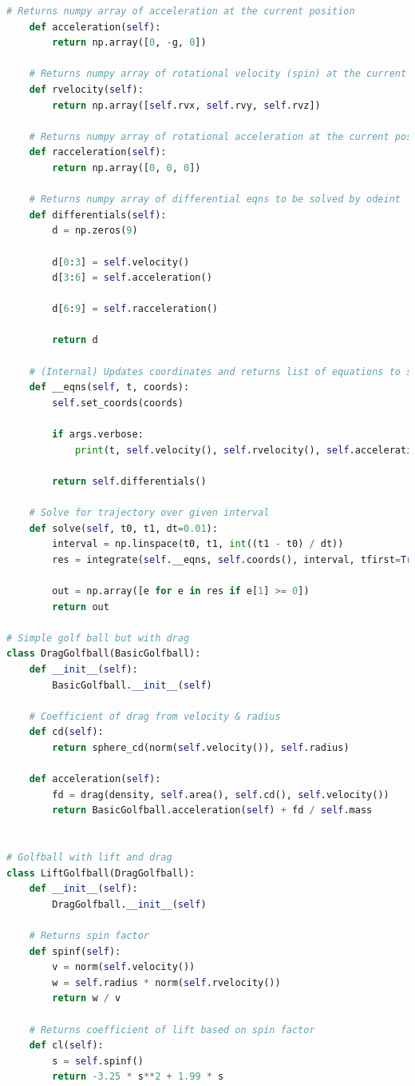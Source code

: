 \documentclass[12pt]{article}
\begin{document}
\begin{lstlisting}[language=Python, caption=Python model, style=PythonStyle, basicstyle=\tiny]
	# Returns numpy array of acceleration at the current position
	def acceleration(self):
		return np.array([0, -g, 0])

	# Returns numpy array of rotational velocity (spin) at the current position
	def rvelocity(self):
		return np.array([self.rvx, self.rvy, self.rvz])

	# Returns numpy array of rotational acceleration at the current position
	def racceleration(self):
		return np.array([0, 0, 0])

	# Returns numpy array of differential eqns to be solved by odeint
	def differentials(self):
		d = np.zeros(9)

		d[0:3] = self.velocity()
		d[3:6] = self.acceleration()

		d[6:9] = self.racceleration()

		return d

	# (Internal) Updates coordinates and returns list of equations to solve (for odeint)
	def __eqns(self, t, coords):
		self.set_coords(coords)

		if args.verbose:
			print(t, self.velocity(), self.rvelocity(), self.acceleration(), self.racceleration())

		return self.differentials()

	# Solve for trajectory over given interval
	def solve(self, t0, t1, dt=0.01):
		interval = np.linspace(t0, t1, int((t1 - t0) / dt))
		res = integrate(self.__eqns, self.coords(), interval, tfirst=True)[:, :3]

		out = np.array([e for e in res if e[1] >= 0])
		return out

# Simple golf ball but with drag
class DragGolfball(BasicGolfball):
	def __init__(self):
		BasicGolfball.__init__(self)

	# Coefficient of drag from velocity & radius
	def cd(self):
		return sphere_cd(norm(self.velocity()), self.radius)

	def acceleration(self):
		fd = drag(density, self.area(), self.cd(), self.velocity())
		return BasicGolfball.acceleration(self) + fd / self.mass


# Golfball with lift and drag
class LiftGolfball(DragGolfball):
	def __init__(self):
		DragGolfball.__init__(self)

	# Returns spin factor
	def spinf(self):
		v = norm(self.velocity())
		w = self.radius * norm(self.rvelocity())
		return w / v

	# Returns coefficient of lift based on spin factor
	def cl(self):
		s = self.spinf()
		return -3.25 * s**2 + 1.99 * s


\end{lstlisting}
\end{document}
